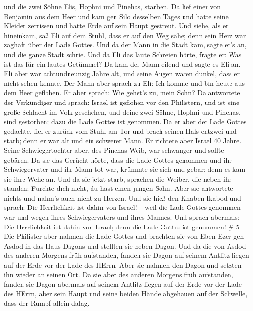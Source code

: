 und die zwei Söhne Elis, Hophni und Pinehas, starben.  Da
lief einer von Benjamin aus dem Heer und kam gen Silo desselben Tages
und hatte seine Kleider zerrissen und hatte Erde auf sein Haupt
gestreut.  Und siehe, als er hineinkam, saß Eli auf dem
Stuhl, dass er auf den Weg sähe; denn sein Herz war zaghaft über der
Lade Gottes. Und da der Mann in die Stadt kam, sagte er's an, und die
ganze Stadt schrie.  Und da Eli das laute Schreien hörte,
fragte er: Was ist das für ein lautes Getümmel? Da kam der Mann eilend
und sagte es Eli an.  Eli aber war achtundneunzig Jahre
alt, und seine Augen waren dunkel, dass er nicht sehen konnte.
 Der Mann aber sprach zu Eli: Ich komme und bin heute aus
dem Heer geflohen. Er aber sprach: Wie gehet's zu, mein Sohn?
 Da antwortete der Verkündiger und sprach: Israel ist
geflohen vor den Philistern, und ist eine große Schlacht im Volk
geschehen, und deine zwei Söhne, Hophni und Pinehas, sind gestorben;
dazu die Lade Gottes ist genommen.  Da er aber der Lade
Gottes gedachte, fiel er zurück vom Stuhl am Tor und brach seinen Hals
entzwei und starb; denn er war alt und ein schwerer Mann. Er richtete
aber Israel 40 Jahre.  Seine Schwiegertochter aber, des
Pinehas Weib, war schwanger und sollte gebären. Da sie das Gerücht
hörte, dass die Lade Gottes genommen und ihr Schwiegervater und ihr Mann
tot war, krümmte sie sich und gebar; denn es kam sie ihre Wehe an.
 Und da sie jetzt starb, sprachen die Weiber, die neben ihr
standen: Fürchte dich nicht, du hast einen jungen Sohn. Aber sie
antwortete nichts und nahm's auch nicht zu Herzen.  Und sie
hieß den Knaben Ikabod und sprach: Die Herrlichkeit ist dahin von
Israel! -- weil die Lade Gottes genommen war und wegen ihres
Schwiegervaters und ihres Mannes.  Und sprach abermals: Die
Herrlichkeit ist dahin von Israel; denn die Lade Gottes ist genommen! \#
5  Die Philister aber nahmen die Lade Gottes und brachten
sie von Eben-Ezer gen Asdod  in das Haus Dagons und stellten
sie neben Dagon.  Und da die von Asdod des anderen Morgens
früh aufstanden, fanden sie Dagon auf seinem Antlitz liegen auf der Erde
vor der Lade des HErrn. Aber sie nahmen den Dagon und setzten ihn wieder
an seinen Ort.  Da sie aber des anderen Morgens früh
aufstanden, fanden sie Dagon abermals auf seinem Antlitz liegen auf der
Erde vor der Lade des HErrn, aber sein Haupt und seine beiden Hände
abgehauen auf der Schwelle, dass der Rumpf allein dalag. 
